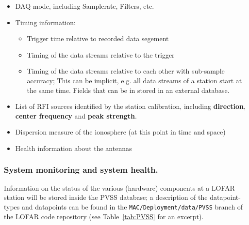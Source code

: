 \documentclass[a4paper,10pt,bibtotoc]{scrartcl}
\begin{document}
\begin{itemize} \parskip 0pt
\item DAQ mode, including Samplerate, Filters, etc.
\item Timing information:
  \begin{itemize}
  \item Trigger time relative to recorded data segement
  \item Timing of the data streams relative to the trigger
  \item Timing of the data streams relative to each other with sub-sample
    accuracy; This can be implicit, e.g. all data streams of a station start
    at the same time. Fields that can be in stored in an external database.
  \end{itemize}
\item List of RFI sources identified by the station calibration, including
  \textbf{direction}, \textbf{center frequency} and \textbf{peak strength}.
\item Dispersion measure of the ionosphere (at this point in time and space)
\item Health information about the antennas
\end{itemize}

\subsubsection{System monitoring and system health.}

Information on the status of the various (hardware) components at a LOFAR station
will be stored inside the PVSS database; a description of the datapoint-types and
datapoints can be found in the \verb|MAC/Deployment/data/PVSS| branch of the
LOFAR code repository (see Table~\ref{tab:PVSS} for an excerpt).
\end{document}
